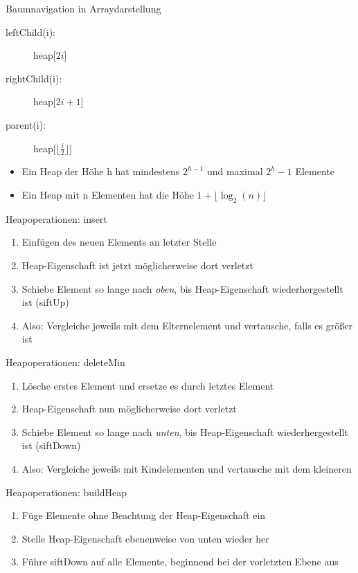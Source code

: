 \begin{frame}{Baumnavigation in Arraydarstellung}
	\begin{description}
		\item[leftChild(i):] heap[$2 i$]
		\item[rightChild(i):] heap[$2 i + 1$]
		\item[parent(i):] heap[$\lfloor \frac{i}{2} \rfloor$]
	\end{description}
	\begin{itemize}
		\item Ein Heap der Höhe h hat mindestens $2^{h - 1} $ und maximal $ 2^{h} - 1$ Elemente
		\item Ein Heap mit n Elementen hat die Höhe $1 + \lfloor \log_2(n) \rfloor$
	\end{itemize}
\end{frame}

\begin{frame}{Heapoperationen: insert}
	\begin{enumerate}
		\item Einfügen des neuen Elements an letzter Stelle
		\item Heap-Eigenschaft ist jetzt möglicherweise dort verletzt
		\item Schiebe Element so lange nach \emph{oben}, bis Heap-Eigenschaft wiederhergestellt ist (siftUp)
		\item Also: Vergleiche jeweils mit dem Elternelement und vertausche, falls es größer ist
	\end{enumerate}
\end{frame}

\begin{frame}{Heapoperationen: deleteMin}
	\begin{enumerate}
		\item Lösche erstes Element und ersetze es durch letztes Element
		\item Heap-Eigenschaft nun möglicherweise dort verletzt
		\item Schiebe Element so lange nach \emph{unten}, bis Heap-Eigenschaft wiederhergestellt ist (siftDown)
		\item Also: Vergleiche jeweils mit Kindelementen und vertausche mit dem kleineren
	\end{enumerate}
\end{frame}

\begin{frame}{Heapoperationen: buildHeap}
	\begin{enumerate}
		\item Füge Elemente ohne Beachtung der Heap-Eigenschaft ein
		\item Stelle Heap-Eigenschaft ebenenweise von unten wieder her
		\item Führe siftDown auf alle Elemente, beginnend bei der vorletzten Ebene aus
	\end{enumerate}
\end{frame}

